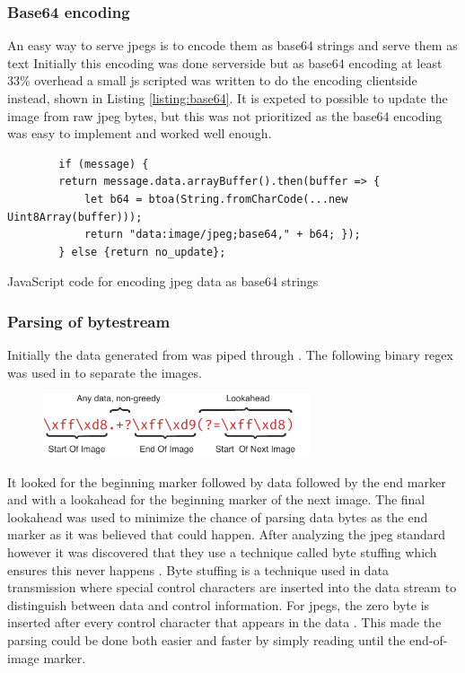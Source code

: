 \subsubsection{Base64 encoding}
An easy way to serve \glspl{jpeg} is to encode them as base64 strings and serve them as text \cite{rAnswerHowDisplay2013}
Initially this encoding was done serverside but as base64 encoding at least 33\% overhead a small \gls{js} scripted was written to do the encoding clientside instead, shown in Listing \ref{listing:base64}.
It is expeted to possible to update the image from raw \gls{jpeg} bytes, but this was not prioritized as the base64 encoding was easy to implement and worked well enough.
\begin{listing}[H]
    \begin{verbatim}
        if (message) {
        return message.data.arrayBuffer().then(buffer => {
            let b64 = btoa(String.fromCharCode(...new Uint8Array(buffer)));
            return "data:image/jpeg;base64," + b64; });
        } else {return no_update};
    \end{verbatim}
    \caption{JavaScript code for encoding \gls{jpeg} data as base64 strings}
    \label{listing:base64}
\end{listing}

\subsubsection{Parsing of bytestream}
Initially the data generated from \gs was piped through .
The following binary \gls{regex} was used in to separate the images.
\begin{figure}[H]
    \centering
    \includegraphics[width=0.7\textwidth]{figures/jpeg_regex.pdf}
\end{figure}
It looked for the beginning marker followed by data followed by the end marker and with a lookahead for the beginning marker of the next image.
The final lookahead was used to minimize the chance of parsing data bytes as the end marker as it was believed that could happen.
After analyzing the \gls{jpeg} standard however it was discovered that they use a technique called byte stuffing which ensures this never happens \cite[91]{ccittINFORMATIONTECHNOLOGYDIGITAL1992}.
Byte stuffing is a technique used in data transmission where special control characters are inserted into the data stream to distinguish between data and control information.
For \glspl{jpeg}, the zero byte is inserted after every control character that appears in the data \cite[91]{ccittINFORMATIONTECHNOLOGYDIGITAL1992}.
This made the parsing could be done both easier and faster by simply reading until the end-of-image marker.

